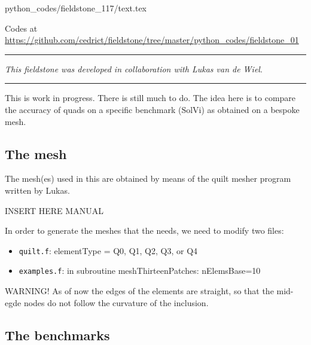 \begin{flushright} {\tiny {\color{gray} python\_codes/fieldstone\_117/text.tex}} \end{flushright}



\begin{center}

Codes at \url{https://github.com/cedrict/fieldstone/tree/master/python_codes/fieldstone_01}
\end{center}

\par\noindent\rule{\textwidth}{0.4pt}

{\sl This fieldstone was developed in collaboration with Lukas van de Wiel}. 

\par\noindent\rule{\textwidth}{0.4pt}

This is work in progress. There is still much to do. The idea here is to compare the 
accuracy of quads on a specific benchmark (SolVi) as obtained on a bespoke mesh.

\subsection*{The mesh}

The mesh(es) used in this \stone are obtained by means of the quilt mesher program written by Lukas. 

INSERT HERE MANUAL


In order to generate the meshes that the \stone needs, we need to modify two files:
\begin{itemize}
\item {\tt quilt.f}: elementType = Q0, Q1, Q2, Q3, or Q4
\item {\tt examples.f}: in subroutine meshThirteenPatches: nElemsBase=10
\end{itemize}

WARNING! As of now the edges of the elements are straight, so that the mid-egde nodes do not 
follow the curvature of the inclusion.

\subsection*{The benchmarks}

